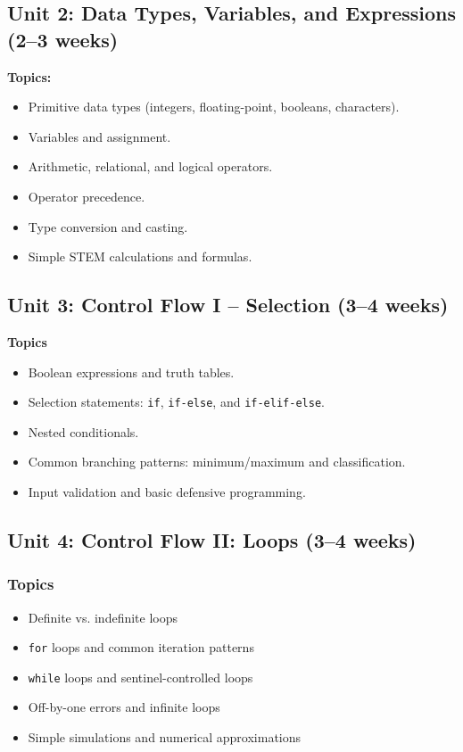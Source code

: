 \documentclass[12pt,oneside]{book}
\begin{document}
\subsection{Unit 2: Data Types, Variables, and Expressions (2--3 weeks)}

\textbf{Topics:}
\begin{itemize}
    \item Primitive data types (integers, floating-point, booleans, characters).
    \item Variables and assignment.
    \item Arithmetic, relational, and logical operators.
    \item Operator precedence.
    \item Type conversion and casting.
    \item Simple STEM calculations and formulas.
\end{itemize}

\subsection{Unit 3: Control Flow I -- Selection (3--4 weeks)}

\textbf{Topics}
\begin{itemize}
    \item Boolean expressions and truth tables.
    \item Selection statements: \texttt{if}, \texttt{if-else}, and \texttt{if-elif-else}.
    \item Nested conditionals.
    \item Common branching patterns: minimum/maximum and classification.
    \item Input validation and basic defensive programming.
\end{itemize}


\subsection{Unit 4: Control Flow II: Loops (3–4 weeks)}

\subsubsection{Topics}

\begin{itemize}
    \item Definite vs. indefinite loops
    \item \texttt{for} loops and common iteration patterns
    \item \texttt{while} loops and sentinel-controlled loops
    \item Off-by-one errors and infinite loops
    \item Simple simulations and numerical approximations
\end{itemize}
\end{document}
